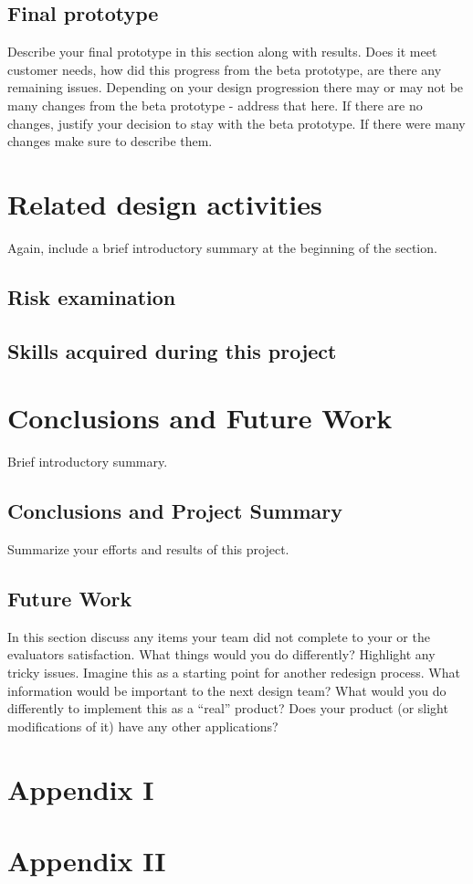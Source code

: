 \documentclass[12pt]{article}
\begin{document}
\subsection{Final prototype}
Describe your final prototype in this section along with results.  Does it meet customer needs, how did this progress from the beta prototype, are there any remaining issues.  Depending on your design progression there may or may not be many changes from the beta prototype - address that here.  If there are no changes, justify your decision to stay with the beta prototype.  If there were many changes make sure to describe them.  




\section{Related design activities}
Again, include a brief introductory summary at the beginning of the section.


\subsection{Risk examination}


\subsection{Skills acquired during this project}



\section{Conclusions and Future Work}
Brief introductory summary.  

\subsection{Conclusions and Project Summary}
Summarize your efforts and results of this project.  

\subsection{Future Work}
In this section discuss any items your team did not complete to your or the evaluators satisfaction.  What things would you do differently? Highlight any tricky issues.  Imagine this as a starting point for another redesign process.  What information would be important to the next design team?  What would you do differently to implement this as a “real” product?  Does your product (or slight modifications of it) have any other applications?  

\newpage
\appendix 

\section{Appendix I}

\section{Appendix II}
\end{document}
